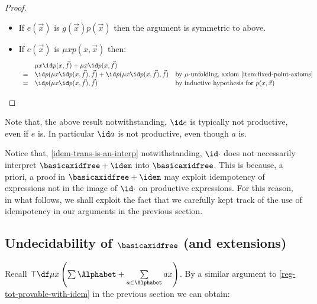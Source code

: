 \begin{proof}
\begin{itemize}
\[\begin{array}{rll}
           = & \id p(\vec f) \id g(\vec f) & \text{by inductive hypothesis for $p(\vec x)$} 
        \end{array}
        \]
        \item If $e(\vec x)$ is $g(\vec x)p(\vec x)$ then the argument is symmetric to above.
        \item If $e(\vec x)$ is $\mu x p(x,\vec x)$ then:
        \[
        \begin{array}{rll}
             & \mu x \id p(x,\vec f) + \mu x \id p(x,\vec f) 
             \\
              =  & \id p (\mu x \id p(x,\vec f),\vec f) + \id p (\mu x \id p(x,\vec f), \vec f) & \text{by $\mu$-unfolding, axiom \eqref{item:fixed-point-axioms}} \\
              = & \id p (\mu x \id p(x,\vec f),\vec f) & \text{by inductive hypothesis for $p(x,\vec x)$} \qedhere
        \end{array}
        \]
    \end{itemize}
\end{proof}

Note that, the above result notwithstanding, $\id e$ is typically not productive, even if $e$ is. In particular $\id a$ is not productive, even though $a$ is.

    Notice that, \cref{idem-trans-is-an-interp} notwithstanding, $\id \cdot$ does not necessarily interpret $\basicaxidfree + \idem$ into $\basicaxidfree$. This is because, a priori, a proof in $\basicaxidfree+\idem$ may exploit idempotency of expressions not in the image of $\id \cdot $ on productive expressions.
    For this reason, in what follows,
    we shall exploit the fact that we carefully kept track of the use of idempotency in our arguments in the previous section.

\subsection{Undecidability of $\basicaxidfree$ (and extensions)}
Recall $\top \df \mu x\left(\sum \Alphabet + \sum\limits_{a\in \Alphabet} ax\right)$.
By a similar argument to \cref{reg-tot-provable-with-idem} in the previous section we can obtain:

